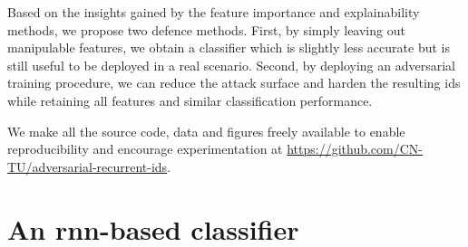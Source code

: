 \documentclass[conference]{IEEEtran}
\begin{document}

Based on the insights gained by the feature importance and explainability methods, we propose two defence methods.
First, by simply leaving out manipulable features, we obtain a classifier which is slightly less accurate but is still useful to be deployed in a real scenario. Second,
by deploying an adversarial training procedure,
we can reduce the attack surface and harden the resulting \gls{ids} while retaining all features and similar classification performance. %

We make all the source code, data and figures freely available to enable reproducibility and encourage experimentation at \url{https://github.com/CN-TU/adversarial-recurrent-ids}.

\section{An \gls{rnn}-based classifier}
\end{document}

